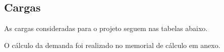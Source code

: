 \subsection{Cargas}

As cargas consideradas para o projeto seguem nas tabelas abaixo.






O cálculo da demanda foi realizado no memorial de cálculo em anexo.


